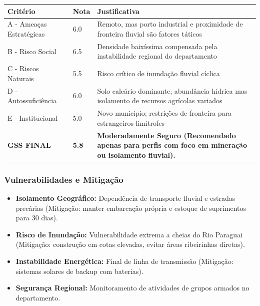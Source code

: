 \begin{table}[ht!]
\small \begin{tabular}{p{3.0cm}p{0.8cm}p{6.0cm}} \toprule
\textbf{Critério} & \textbf{Nota} & \textbf{Justificativa} \\ \midrule
A - Ameaças Estratégicas & 6.0 & Remoto, mas porto industrial e proximidade de fronteira fluvial são fatores táticos \\
B - Risco Social & 6.5 & Densidade baixíssima compensada pela instabilidade regional do departamento \\
C - Riscos Naturais & 5.5 & Risco crítico de inundação fluvial cíclica \\
D - Autossuficiência & 6.0 & Solo calcário dominante; abundância hídrica mas isolamento de recursos agrícolas variados \\
E - Institucional & 5.0 & Novo município; restrições de fronteira para estrangeiros limítrofes \\
\midrule \textbf{GSS FINAL} & \textbf{5.8} & \textbf{Moderadamente Seguro (Recomendado apenas para perfis com foco em mineração ou isolamento fluvial).} \\ \bottomrule \end{tabular}
\end{table}
\subsubsection{Vulnerabilidades e
Mitigação}

\begin{itemize}
\tightlist
\item
  \textbf{Isolamento Geográfico:} Dependência de transporte fluvial e
  estradas precárias (Mitigação: manter embarcação própria e estoque de
  suprimentos para 30 dias).
\item
  \textbf{Risco de Inundação:} Vulnerabilidade extrema a cheias do Rio
  Paraguai (Mitigação: construção em cotas elevadas, evitar áreas
  ribeirinhas diretas).
\item
  \textbf{Instabilidade Energética:} Final de linha de transmissão
  (Mitigação: sistemas solares de backup com baterias).
\item
  \textbf{Segurança Regional:} Monitoramento de atividades de grupos
  armados no departamento.
\end{itemize}

